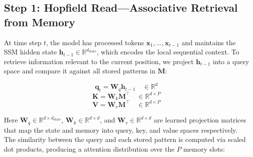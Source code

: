 \documentclass[journal,10pt]{IEEEtran}
\newcommand{\R}{\mathbb{R}}
\begin{document}
\begin{figure}[t]
\vspace{3mm}
\end{figure}

\subsection{Step 1: Hopfield Read---Associative Retrieval from Memory}
\label{sec:hopfield_read}

At time step $t$, the model has processed tokens $\bm{x}_1, \dots, \bm{x}_{t-1}$ and maintains the SSM hidden state $\bm{h}_{t-1} \in \R^{d_{\text{state}}}$, which encodes the local sequential context. To retrieve information relevant to the current position, we project $\bm{h}_{t-1}$ into a query space and compare it against all stored patterns in $\bm{M}$:

\begin{equation}
    \bm{q}_t = \bm{W}_q \bm{h}_{t-1} \quad \in \R^d
    \label{eq:query_proj}
\end{equation}
\begin{equation}
    \bm{K} = \bm{W}_k \bm{M}^\top \quad \in \R^{d \times P}
    \label{eq:key_proj}
\end{equation}
\begin{equation}
    \bm{V} = \bm{W}_v \bm{M}^\top \quad \in \R^{d \times P}
    \label{eq:val_proj}
\end{equation}

Here $\bm{W}_q \in \R^{d \times d_{\text{state}}}$, $\bm{W}_k \in \R^{d \times d}$, and $\bm{W}_v \in \R^{d \times d}$ are learned projection matrices that map the state and memory into query, key, and value spaces respectively. The similarity between the query and each stored pattern is computed via scaled dot products, producing a attention distribution over the $P$ memory slots:
\end{document}
